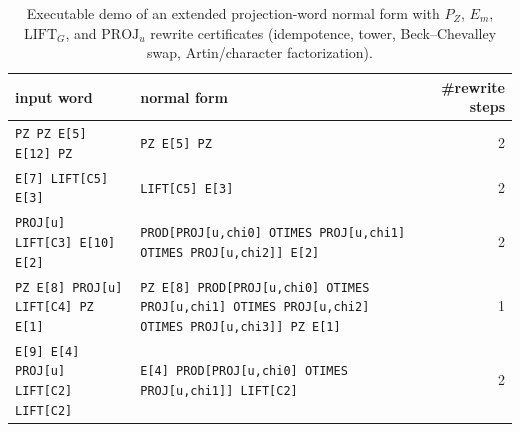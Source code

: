 \begin{table}[H]
\centering
\scriptsize
\setlength{\tabcolsep}{6pt}
\caption{Executable demo of an extended projection-word normal form with $P_Z$, $E_m$, $\mathrm{LIFT}_G$, and $\mathrm{PROJ}_u$ rewrite certificates (idempotence, tower, Beck--Chevalley swap, Artin/character factorization).}
\label{tab:pom_projword_lift_proj_normalizer_demo}
\begin{tabular}{l l r}
\toprule
input word & normal form & \#rewrite steps\\
\midrule
\texttt{PZ PZ E[5] E[12] PZ} & \texttt{PZ E[5] PZ} & 2\\
\texttt{E[7] LIFT[C5] E[3]} & \texttt{LIFT[C5] E[3]} & 2\\
\texttt{PROJ[u] LIFT[C3] E[10] E[2]} & \texttt{PROD[PROJ[u,chi0] OTIMES PROJ[u,chi1] OTIMES PROJ[u,chi2]] E[2]} & 2\\
\texttt{PZ E[8] PROJ[u] LIFT[C4] PZ E[1]} & \texttt{PZ E[8] PROD[PROJ[u,chi0] OTIMES PROJ[u,chi1] OTIMES PROJ[u,chi2] OTIMES PROJ[u,chi3]] PZ E[1]} & 1\\
\texttt{E[9] E[4] PROJ[u] LIFT[C2] LIFT[C2]} & \texttt{E[4] PROD[PROJ[u,chi0] OTIMES PROJ[u,chi1]] LIFT[C2]} & 2\\
\bottomrule
\end{tabular}
\end{table}
